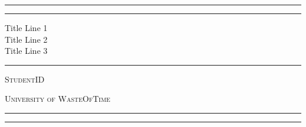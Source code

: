 
\newlength{\drop} %
\textheight %

\centering
\rule{\textwidth}{1pt}\par %
\vspace{2pt}\vspace{-\baselineskip} %
\rule{\textwidth}{0.4pt}\par %

\vspace{\drop} %
{\Huge Title Line 1}\\[0.75\baselineskip] %
{\Huge Title Line 2}\\[0.75\baselineskip]
{\Huge Title Line 3} %

\vspace{0.25\drop} %
\rule{0.3\textwidth}{0.4pt}\par %
\vspace{\drop} %

{\Large \textsc{StudentID}}\par %

\vfill
{\large \textsc{University of WasteOfTime}}\par %
\vspace*{\drop} %

\rule{\textwidth}{0.4pt}\par %
\vspace{2pt}\vspace{-\baselineskip} %
\rule{\textwidth}{1pt}\par %